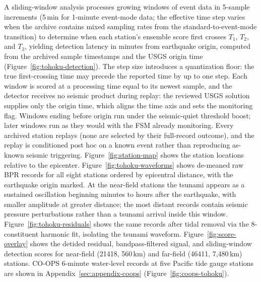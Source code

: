 \documentclass{article}
\begin{document}
A sliding-window analysis processes growing windows of event data in
5-sample increments (5\,min for 1-minute event-mode data; the effective
time step varies when the archive contains mixed sampling rates from the
standard-to-event-mode transition) to determine when each station's
ensemble score first crosses $T_1$, $T_2$, and $T_3$, yielding
detection latency in minutes from earthquake origin, computed from
the archived sample timestamps and the USGS origin time
(Figure~\ref{fig:tohoku-detection}).
The step size introduces a quantization floor: the true first-crossing
time may precede the reported time by up to one step.
Each window is scored at a processing time equal to its newest sample,
and the detector receives no seismic product during replay: the
reviewed USGS solution supplies only the origin time, which aligns the
time axis and sets the monitoring flag. Windows ending before origin
run under the seismic-quiet threshold boost; later windows run as they
would with the FSM already monitoring. Every archived station replays
(none are selected by their full-record outcome), and the replay is
conditioned post hoc on a known event rather than reproducing as-known
seismic triggering.
Figure~\ref{fig:station-map} shows the station locations relative
to the epicenter.
Figure~\ref{fig:tohoku-waveforms} shows de-meaned raw BPR records
for all eight stations ordered by epicentral distance, with
the earthquake origin marked.  At the near-field stations the tsunami appears as a sustained
oscillation beginning minutes to hours after the earthquake, with
smaller amplitude at greater distance; the most distant records
contain seismic pressure perturbations rather than a tsunami arrival
inside this window.
Figure~\ref{fig:tohoku-residuals} shows the same records after
tidal removal via the 8-constituent harmonic fit, isolating the
tsunami waveform.
Figure~\ref{fig:score-overlay} shows the detided residual,
bandpass-filtered signal, and sliding-window detection scores for
near-field (21418, 560\,km) and far-field (46411, 7{,}480\,km)
stations.
CO-OPS 6-minute water-level records at five Pacific tide gauge
stations are shown in Appendix~\ref{sec:appendix-coops}
(Figure~\ref{fig:coops-tohoku}).
\end{document}
